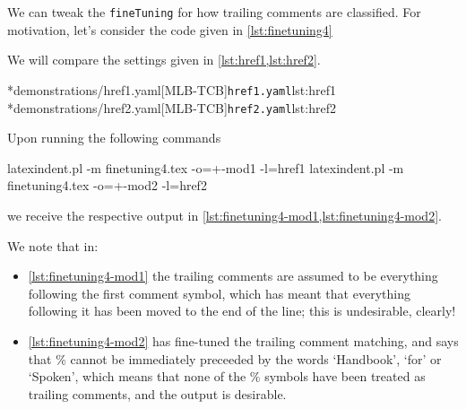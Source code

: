  \begin{example}
	 We can tweak the \texttt{fineTuning} for how trailing comments are classified. For motivation, let's consider
	 the code given in \cref{lst:finetuning4}


	 We will compare the settings given in \cref{lst:href1,lst:href2}.

	 \begin{cmhtcbraster}[raster column skip=.01\linewidth,
			 raster left skip=0cm,
			 raster right skip=-0.5cm,]
		 \cmhlistingsfromfile[style=yaml-LST]*{demonstrations/href1.yaml}[MLB-TCB]{\texttt{href1.yaml}}{lst:href1}
		 \cmhlistingsfromfile[style=yaml-LST]*{demonstrations/href2.yaml}[MLB-TCB]{\texttt{href2.yaml}}{lst:href2}
	 \end{cmhtcbraster}

	 Upon running the following commands
	 \begin{commandshell}
latexindent.pl -m finetuning4.tex -o=+-mod1 -l=href1
latexindent.pl -m finetuning4.tex -o=+-mod2 -l=href2
\end{commandshell}
	 we receive the respective output in \cref{lst:finetuning4-mod1,lst:finetuning4-mod2}.

	 \begin{widepage}

	 \end{widepage}

	 We note that in:
	 \begin{itemize}
		 \item \cref{lst:finetuning4-mod1} the trailing comments are assumed to be everything following
		       the first comment symbol, which has meant that everything following it has been moved to
		       the end of the line; this is undesirable, clearly!
		 \item \cref{lst:finetuning4-mod2} has fine-tuned the trailing comment matching, and says that
		       \% cannot
		       be immediately preceeded by the words `Handbook', `for' or `Spoken', which means that
		       none of the \% symbols have been treated as trailing comments, and the output is
		       desirable.
	 \end{itemize}


\end{example}
